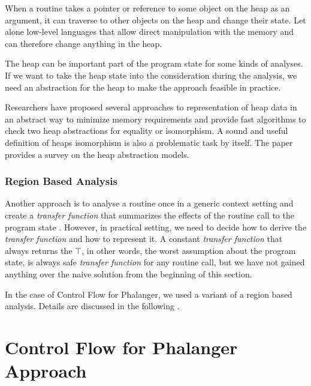         When a routine takes a pointer or reference to some object 
        on the heap as an argument, it can traverse to other 
        objects on the heap and change their state. Let alone low-level 
        languages that allow direct manipulation with the memory and 
        can therefore change anything in the heap. 
        
        The heap can be important part of the program state for 
        some kinds of analyses. If we want to take the heap state 
        into the consideration during the analysis, we need an 
        abstraction for the heap to make the approach feasible 
        in practice.
        
        Researchers have proposed several approaches to representation 
        of heap data in an abstract way to minimize memory requirements 
        and provide fast algorithms to check two heap abstractions 
        for equality or isomorphism. A sound and useful definition 
        of heaps isomorphism is also a problematic task by itself. 
        The paper \cite{kanvar2014heap} provides a survey on the heap 
        abstraction models.
        
        \subsubsection*{Region Based Analysis}
        
        Another approach is to analyse a routine once in a 
        generic context setting and create a \emph{transfer function} 
        that summarizes the effects of the routine call to the 
        program state \cite{aho1985compilers}. However, in practical setting, 
        we need to decide how to derive the \emph{transfer function} and how to 
        represent it. A constant \emph{transfer function} that always 
        returns the $\top$, in other words, the worst assumption about 
        the program state, is always safe \emph{transfer function} 
        for any routine call, but we have not gained anything over 
        the naive solution from the beginning of this section.
        
        In the case of Control Flow for Phalanger, we used 
        a variant of a region based analysis. Details are 
        discussed in the following \wsection{}.
    
    \section{Control Flow for Phalanger Approach}
        
